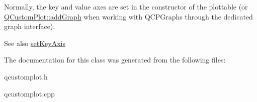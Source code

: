 Normally, the key and value axes are set in the constructor of the plottable (or \hyperlink{classQCustomPlot_a6fb2873d35a8a8089842d81a70a54167}{Q\+Custom\+Plot\+::add\+Graph} when working with Q\+C\+P\+Graphs through the dedicated graph interface).

\begin{DoxySeeAlso}{See also}
\hyperlink{classQCPAbstractPlottable_a8524fa2994c63c0913ebd9bb2ffa3920}{set\+Key\+Axis} 
\end{DoxySeeAlso}


The documentation for this class was generated from the following files\+:\begin{DoxyCompactItemize}
\item 
qcustomplot.\+h\item 
qcustomplot.\+cpp\end{DoxyCompactItemize}
